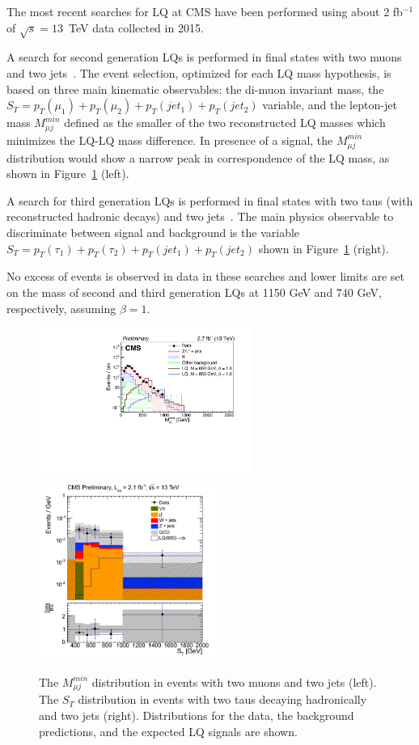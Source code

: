 \documentclass[epj]{webofc}
\begin{document}
The most recent searches for LQ at CMS have been performed using about 2 fb$^{-1}$ of 
$\sqrt{s}=13$~TeV data collected in 2015.

A search for second generation LQs is
performed in final states with two muons and two jets~\cite{CMS:2016qhm}. The event
selection, optimized for each LQ mass hypothesis, is based on three
main kinematic observables: the di-muon invariant mass, the
$S_T=p_T(\mu_1)+p_T(\mu_2)+p_T(jet_1)+p_T(jet_2)$ variable, and the
lepton-jet mass $M^{min}_{\mu j}$ defined as the smaller of the two reconstructed
LQ masses which minimizes the LQ-LQ mass difference. In presence of a
signal, the $M^{min}_{\mu j}$ distribution would show a narrow peak in 
correspondence of the LQ mass, as shown in Figure~\ref{LQresults} (left). 

A search for third generation LQs is performed in final states with
two taus (with reconstructed hadronic decays) and two jets~\cite{CMS:2016xxl}.
The main physics observable to discriminate between signal and
background is the variable $S_T=p_T(\tau_1)+p_T(\tau_2)+p_T(jet_1)+p_T(jet_2)$
shown in Figure~\ref{LQresults} (right). 

No excess of events is observed in data in these searches and lower
limits are set on the mass of second and third generation LQs at 1150
GeV and 740 GeV, respectively, assuming $\beta=1$.
%
\begin{figure}[h]
\centering
\includegraphics[width=7cm,clip]{CMS-PAS-EXO-16-007_Figure_002-c.pdf}
\includegraphics[width=6cm,clip]{CMS-PAS-EXO-16-016_Figure_002-b.png}
\caption{The $M^{min}_{\mu j}$ distribution in events with two muons and two
  jets (left). The $S_T$ distribution in events with two taus
  decaying hadronically and two jets (right). Distributions for the
  data, the background predictions, and the expected LQ signals are shown.}
\label{LQresults}       %
\end{figure}
%
\end{document}
